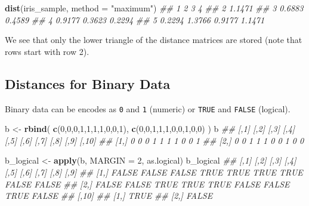 \documentclass[
  notitlepage]{book}
\newenvironment{Shaded}{\begin{snugshade}}{\end{snugshade}}
\newcommand{\CommentTok}[1]{\textcolor[rgb]{0.56,0.35,0.01}{\textit{#1}}}
\newcommand{\DataTypeTok}[1]{\textcolor[rgb]{0.13,0.29,0.53}{#1}}
\newcommand{\DecValTok}[1]{\textcolor[rgb]{0.00,0.00,0.81}{#1}}
\newcommand{\KeywordTok}[1]{\textcolor[rgb]{0.13,0.29,0.53}{\textbf{#1}}}
\newcommand{\NormalTok}[1]{#1}
\newcommand{\StringTok}[1]{\textcolor[rgb]{0.31,0.60,0.02}{#1}}
\begin{document}
\begin{Shaded}
\begin{Highlighting}[]
\KeywordTok{dist}\NormalTok{(iris\_sample, }\DataTypeTok{method =} \StringTok{"maximum"}\NormalTok{)}
\CommentTok{\#\#        1      2      3      4}
\CommentTok{\#\# 2 1.1471                     }
\CommentTok{\#\# 3 0.6883 0.4589              }
\CommentTok{\#\# 4 0.9177 0.3623 0.2294       }
\CommentTok{\#\# 5 0.2294 1.3766 0.9177 1.1471}
\end{Highlighting}
\end{Shaded}

We see that only the lower triangle of the distance matrices are stored
(note that rows start with row 2).

\hypertarget{distances-for-binary-data}{%
\subsection{Distances for Binary Data}\label{distances-for-binary-data}}

Binary data can be encodes as \texttt{0} and \texttt{1} (numeric) or \texttt{TRUE} and
\texttt{FALSE} (logical).

\begin{Shaded}
\begin{Highlighting}[]
\NormalTok{b \textless{}{-}}\StringTok{ }\KeywordTok{rbind}\NormalTok{(}
  \KeywordTok{c}\NormalTok{(}\DecValTok{0}\NormalTok{,}\DecValTok{0}\NormalTok{,}\DecValTok{0}\NormalTok{,}\DecValTok{1}\NormalTok{,}\DecValTok{1}\NormalTok{,}\DecValTok{1}\NormalTok{,}\DecValTok{1}\NormalTok{,}\DecValTok{0}\NormalTok{,}\DecValTok{0}\NormalTok{,}\DecValTok{1}\NormalTok{),}
  \KeywordTok{c}\NormalTok{(}\DecValTok{0}\NormalTok{,}\DecValTok{0}\NormalTok{,}\DecValTok{1}\NormalTok{,}\DecValTok{1}\NormalTok{,}\DecValTok{1}\NormalTok{,}\DecValTok{0}\NormalTok{,}\DecValTok{0}\NormalTok{,}\DecValTok{1}\NormalTok{,}\DecValTok{0}\NormalTok{,}\DecValTok{0}\NormalTok{)}
\NormalTok{  )}
\NormalTok{b}
\CommentTok{\#\#      [,1] [,2] [,3] [,4] [,5] [,6] [,7] [,8] [,9] [,10]}
\CommentTok{\#\# [1,]    0    0    0    1    1    1    1    0    0     1}
\CommentTok{\#\# [2,]    0    0    1    1    1    0    0    1    0     0}
\end{Highlighting}
\end{Shaded}

\begin{Shaded}
\begin{Highlighting}[]
\NormalTok{b\_logical \textless{}{-}}\StringTok{ }\KeywordTok{apply}\NormalTok{(b, }\DataTypeTok{MARGIN =} \DecValTok{2}\NormalTok{, as.logical)}
\NormalTok{b\_logical}
\CommentTok{\#\#       [,1]  [,2]  [,3] [,4] [,5]  [,6]  [,7]  [,8]  [,9]}
\CommentTok{\#\# [1,] FALSE FALSE FALSE TRUE TRUE  TRUE  TRUE FALSE FALSE}
\CommentTok{\#\# [2,] FALSE FALSE  TRUE TRUE TRUE FALSE FALSE  TRUE FALSE}
\CommentTok{\#\#      [,10]}
\CommentTok{\#\# [1,]  TRUE}
\CommentTok{\#\# [2,] FALSE}
\end{Highlighting}
\end{Shaded}
\end{document}
